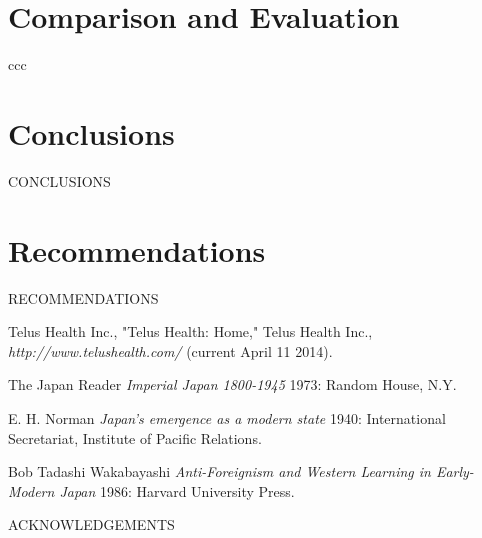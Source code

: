 \documentclass[12pt]{article}
\begin{document}
\section{Comparison and Evaluation}
ccc


\section{Conclusions}
CONCLUSIONS


\section{Recommendations}
RECOMMENDATIONS


\newpage



\begin{thebibliography}{1}

   Telus Health Inc., "Telus Health: Home," Telus Health Inc., {\em http://www.telushealth.com/} (current April 11 2014).

    The Japan Reader {\em Imperial Japan 1800-1945} 1973:
  Random House, N.Y.

   E. H. Norman {\em Japan's emergence as a modern
  state} 1940: International Secretariat, Institute of Pacific
  Relations.

   Bob Tadashi Wakabayashi {\em Anti-Foreignism and Western
  Learning in Early-Modern Japan} 1986: Harvard University Press.

\end{thebibliography}
\newpage


ACKNOWLEDGEMENTS
\newpage


\end{document}
